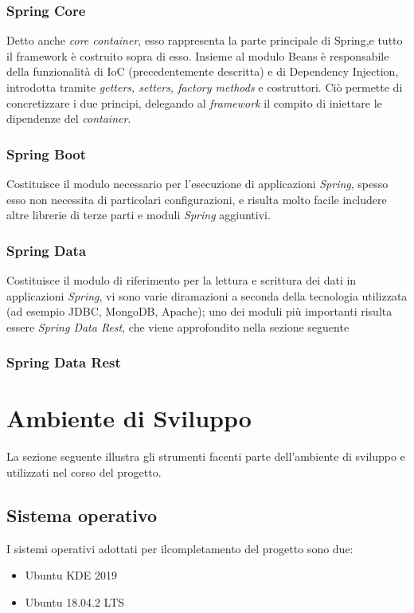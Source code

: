 \subsubsection{Spring Core}
Detto anche \textit{core container}, esso rappresenta la parte principale di Spring,e tutto il framework è costruito sopra di esso.
Insieme al modulo Beans è responsabile della funzionalità di IoC (precedentemente descritta) e  di Dependency Injection, introdotta tramite \textit{getters, setters, factory methods} e costruttori.
Ciò permette di concretizzare i due principi, delegando al \textit{framework} il compito di iniettare le dipendenze del \textit{container}.



\subsubsection{Spring Boot}
Costituisce il modulo necessario per l'esecuzione di applicazioni \textit{Spring}, spesso esso non necessita di particolari configurazioni, e risulta molto facile includere altre librerie di terze parti e moduli \textit{Spring} aggiuntivi.\\

\subsubsection{Spring Data}
Costituisce il modulo di riferimento per la lettura e scrittura dei dati in applicazioni \textit{Spring}, vi sono varie diramazioni 	a seconda della tecnologia utilizzata (ad esempio JDBC, MongoDB, Apache); uno dei moduli più importanti risulta essere \textit{Spring Data Rest}, che viene approfondito nella sezione seguente

\subsubsection{Spring Data Rest}

\section{Ambiente di Sviluppo}
La sezione seguente illustra gli strumenti facenti parte dell'ambiente di sviluppo e utilizzati nel corso del progetto.

\subsection{Sistema operativo}
I sistemi operativi adottati per ilcompletamento del progetto sono due:
\begin{itemize}
	\item Ubuntu KDE 2019
	\item Ubuntu 18.04.2 LTS
\end{itemize}

